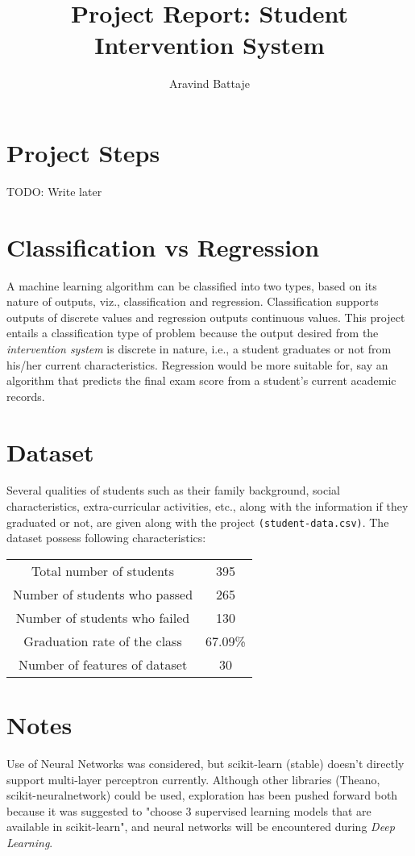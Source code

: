 \documentclass{article}
\begin{document}
	
	\title{Project Report: Student Intervention System}
	\author{Aravind Battaje}
	\maketitle
	\section{Project Steps}
	TODO: Write later
	
	\section{Classification vs Regression}
	A machine learning algorithm can be classified into two types, based on its nature of outputs, viz., classification and regression. Classification supports outputs of discrete values and regression outputs continuous values. This project entails a classification type of problem because the output desired from the \emph{intervention system} is discrete in nature, i.e., a student graduates or not from his/her current characteristics. Regression would be more suitable for, say an algorithm that predicts the final exam score from a student's current academic records.
	
	\section{Dataset}
	Several qualities of students such as their family background, social characteristics, extra-curricular activities, etc., along with the information if they graduated or not, are given along with the project \texttt{(student-data.csv)}. The dataset possess following characteristics:
	\begin{center}
		\begin{tabular}{| c | c |}
			\hline
			Total number of students & 395 \\
			Number of students who passed & 265 \\
			Number of students who failed & 130  \\
			Graduation rate of the class & 67.09\% \\
			Number of features of dataset & 30 \\
			\hline
		\end{tabular}
		\label{tab:data_characteristics}
	\end{center}
	
	\section{Notes}
	Use of Neural Networks was considered, but scikit-learn (stable) doesn't directly support multi-layer perceptron currently. Although other libraries (Theano, scikit-neuralnetwork) could be used, exploration has been pushed forward both because it was suggested to "choose 3 supervised learning models that are available in scikit-learn", and neural networks will be encountered during \emph{Deep Learning}.
\end{document}
